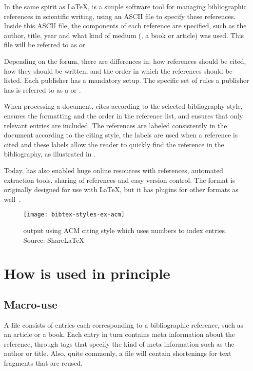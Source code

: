 In the same spirit as {\LaTeX}, {\bibtex} is a simple software tool
for managing bibliographic references in scientific writing, using an
ASCII file to specify these references.  Inside this ASCII file, the
components of each reference are specified, such as the author, title,
year and what kind of medium (\eg, a book or article) was used.  This
file will be referred to as  or

Depending on the forum, there are differences in: how references
should be cited, how they should be written, and the order in which
the references should be listed.  Each publisher has a mandatory
setup.  The specific set of rules a publisher has is referred to as a
 or .

When processing a document, {\bibtex} cites according to the selected
bibliography style, ensures the formatting and the order in the
reference list, and ensures that only relevant entries are included.
The references are labeled consistently in the document according to
the citing style, the labels are used when a reference is cited and
these labels allow the reader to quickly find the reference in the
bibliography, as illustrated in .

Today, {\bibtex} has also enabled huge online resources with
references, automated extraction tools, sharing of references and easy
version control.  The {\bibtex} format is originally designed for use
with {\LaTeX}, but it has plugins for other formats as
well~\cite{bibtex_resource}.

\begin{figure}
  \centering
  \texttt{[image: bibtex-styles-ex-acm]}
  \caption{{\bibtex} output using ACM citing style which uses numbers to
    index entries.  Source: ShareLaTeX~\cite{sharelatex2016_styles}}
\label{fig:bibtex_example_acm}
\end{figure}

\section{How {\bibtex} is used in principle}
\label{sec:practice_of_bibtex}

\subsection{Macro-use}

A {\bibtex} file consists of entries each corresponding to a
bibliographic reference, such as an article or a book.  Each entry in
turn contains meta information about the reference, through tags that
specify the kind of meta information such as the author or title.
Also, quite commonly, a file will contain shortenings for text
fragments that are reused.

